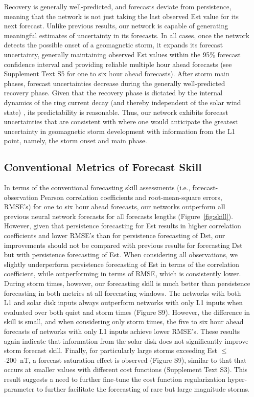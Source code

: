 Recovery is generally well-predicted, and forecasts deviate from persistence, meaning that the network is not just taking the last observed Est value for its next forecast. Unlike previous results, our network is capable of generating meaningful estimates of uncertainty in its forecasts. In all cases, once the network detects the possible onset of a geomagnetic storm, it expands its forecast uncertainty, generally maintaining observed Est values within the 95\% forecast confidence interval and providing reliable multiple hour ahead forecasts (see Supplement Text S5 for one to six hour ahead forecasts). After storm main phases, forecast uncertainties decrease during the generally well-predicted recovery phase. Given that the recovery phase is dictated by the internal dynamics of the ring current decay (and thereby independent of the solar wind state) \citep{Daglis2007}, its predictability is reasonable. Thus, our network exhibits forecast uncertainties that are consistent with where one would anticipate the greatest uncertainty in geomagnetic storm development with information from the L1 point, namely, the storm onset and main phase.

\subsection{Conventional Metrics of Forecast Skill}

In terms of the conventional forecasting skill assessments (i.e., forecast-observation Pearson correlation coefficients and root-mean-square errors, RMSE's) for one to six hour ahead forecasts, our networks outperform all previous neural network forecasts for all forecasts lengths (Figure~\ref{fig:skill}). However, given that persistence forecasting for Est results in higher correlation coefficients and lower RMSE's than for persistence forecasting of Dst, our improvements should not be compared with previous results for forecasting Dst but with persistence forecasting of Est. When considering all observations, we slightly underperform persistence forecasting of Est in terms of the correlation coefficient, while outperforming in terms of RMSE, which is consistently lower. During storm times, however, our forecasting skill is much better than persistence forecasting in both metrics at all forecasting windows. The networks with both L1 and solar disk inputs always outperform networks with only L1 inputs when evaluated over both quiet and storm times (Figure S9). However, the difference in skill is small, and when considering only storm times, the five to six hour ahead forecasts of networks with only L1 inputs achieve lower RMSE's. These results again indicate that information from the solar disk does not significantly improve storm forecast skill. Finally, for particularly large storms exceeding Est $\leq$ -200~nT, a forecast saturation effect is observed (Figure S9), similar to that that occurs at smaller values with different cost functions (Supplement Text S3). This result suggests a need to further fine-tune the cost function regularization hyper-parameter to further facilitate the forecasting of rare but large magnitude storms.

